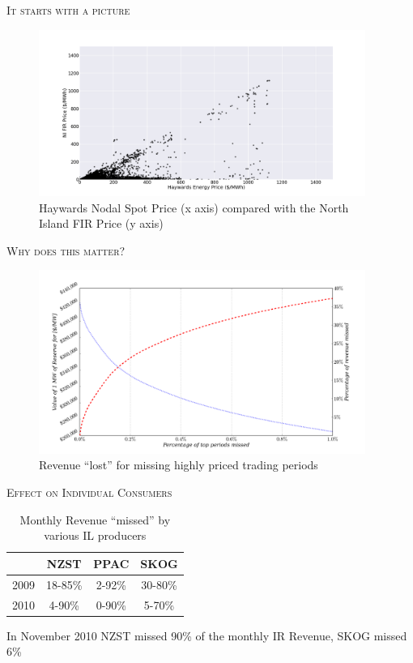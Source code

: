 \documentclass[xcolor=x11names,compress]{beamer}
\renewcommand{\(}{\begin{columns}}
\renewcommand{\)}{\end{columns}}
\newcommand{\<}[1]{\begin{column}{#1}}
\renewcommand{\>}{\end{column}}
\begin{document}
\begin{frame}{\scshape It starts with a picture}
\begin{figure}
\includegraphics[width=0.95\textwidth]{img/haywards_vs_ni_fir.png}
\caption{Haywards Nodal Spot Price (x axis) compared with the North Island
FIR Price (y axis)}
\end{figure}
\end{frame}

\begin{frame}{\scshape Why does this matter?}
\begin{figure}
\includegraphics[width=0.95\textwidth]{img/reserveprice.png}
\caption{Revenue ``lost'' for missing highly priced trading periods}
\end{figure}
\end{frame}

\begin{frame}{\scshape Effect on Individual Consumers}
\begin{table}
\caption{Monthly Revenue ``missed'' by various IL producers}
\begin{tabular}{cccc}
\toprule
& NZST & PPAC & SKOG \\
\midrule
2009 & 18-85\% & 2-92\% & 30-80\% \\
2010 & 4-90\% & 0-90\% & 5-70\% \\
\bottomrule
\end{tabular}
\end{table}
In November 2010 NZST missed 90\% of the monthly IR Revenue, SKOG missed 6\%
\vspace{2cm}
\end{frame}
\end{document}

